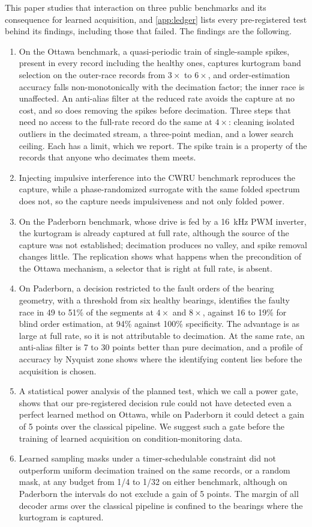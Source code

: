 This paper studies that interaction on three public benchmarks and its consequence for learned
acquisition, and \ref{app:ledger} lists every pre-registered test behind its findings, including
those that failed. The findings are the following.
\begin{enumerate}
  \item On the Ottawa benchmark, a quasi-periodic train of single-sample spikes, present in every
  record including the healthy ones, captures kurtogram band selection on the outer-race records
  from $3\times$ to $6\times$, and order-estimation accuracy falls non-monotonically with the
  decimation factor; the inner race is unaffected. An anti-alias filter at the reduced rate avoids
  the capture at no cost, and so does removing the spikes before decimation. Three steps that need
  no access to the full-rate record do the same at $4\times$: cleaning isolated outliers in the
  decimated stream, a three-point median, and a lower search ceiling. Each has a limit, which we
  report. The spike train is a property of the records that anyone who decimates them meets.
  \item Injecting impulsive interference into the CWRU benchmark \citep{smith2015cwru} reproduces
  the capture, while a phase-randomized surrogate with the same folded spectrum does not, so the
  capture needs impulsiveness and not only folded power.
  \item On the Paderborn benchmark, whose drive is fed by a 16~kHz PWM inverter, the kurtogram is
  already captured at full rate, although the source of the capture was not established;
  decimation produces no valley, and spike removal changes little.
  The replication shows what happens when the precondition of the Ottawa mechanism, a selector that
  is right at full rate, is absent.
  \item On Paderborn, a decision restricted to the fault orders of the bearing geometry, with a
  threshold from six healthy bearings, identifies the faulty race in 49 to 51\% of the segments at
  $4\times$ and $8\times$, against 16 to 19\% for blind order estimation, at 94\% against 100\%
  specificity. The advantage is as large at full rate, so it is not attributable to decimation.
  At the same rate, an anti-alias filter is 7 to 30 points better than pure decimation, and a
  profile of accuracy by Nyquist zone shows where the identifying content lies before the
  acquisition is chosen.
  \item A statistical power analysis of the planned test, which we call a power gate, shows that our
  pre-registered decision rule could not have detected even a perfect learned method on Ottawa,
  while on Paderborn it could detect a gain of 5 points over the classical pipeline. We suggest such
  a gate before the training of learned acquisition on condition-monitoring data.
  \item Learned sampling masks under a timer-schedulable constraint did not outperform uniform
  decimation trained on the same records, or a random mask, at any budget from 1/4 to 1/32 on
  either benchmark, although on Paderborn the intervals do not exclude a gain of 5 points. The
  margin of all decoder arms over the classical pipeline is confined to the bearings where the
  kurtogram is captured.
\end{enumerate}
